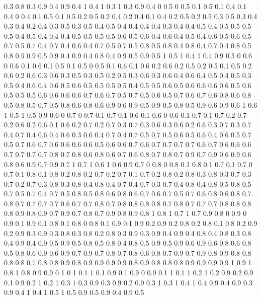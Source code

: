 0.3 0.8
0.3 0.9
0.4 0.9
0.4 1
0.4 1
0.3 1
0.3 0.9
0.4 0
0.5 0
0.5 0.1
0.5 0.1
0.4 0.1
0.4 0
0.4 0.1
0.5 0.1
0.5 0.2
0.5 0.2
0.4 0.2
0.4 0.1
0.4 0.2
0.5 0.2
0.5 0.3
0.5 0.3
0.4 0.3
0.4 0.2
0.4 0.3
0.5 0.3
0.5 0.4
0.5 0.4
0.4 0.4
0.4 0.3
0.4 0.4
0.5 0.4
0.5 0.5
0.5 0.5
0.4 0.5
0.4 0.4
0.4 0.5
0.5 0.5
0.5 0.6
0.5 0.6
0.4 0.6
0.4 0.5
0.4 0.6
0.5 0.6
0.5 0.7
0.5 0.7
0.4 0.7
0.4 0.6
0.4 0.7
0.5 0.7
0.5 0.8
0.5 0.8
0.4 0.8
0.4 0.7
0.4 0.8
0.5 0.8
0.5 0.9
0.5 0.9
0.4 0.9
0.4 0.8
0.4 0.9
0.5 0.9
0.5 1
0.5 1
0.4 1
0.4 0.9
0.5 0
0.6 0
0.6 0.1
0.6 0.1
0.5 0.1
0.5 0
0.5 0.1
0.6 0.1
0.6 0.2
0.6 0.2
0.5 0.2
0.5 0.1
0.5 0.2
0.6 0.2
0.6 0.3
0.6 0.3
0.5 0.3
0.5 0.2
0.5 0.3
0.6 0.3
0.6 0.4
0.6 0.4
0.5 0.4
0.5 0.3
0.5 0.4
0.6 0.4
0.6 0.5
0.6 0.5
0.5 0.5
0.5 0.4
0.5 0.5
0.6 0.5
0.6 0.6
0.6 0.6
0.5 0.6
0.5 0.5
0.5 0.6
0.6 0.6
0.6 0.7
0.6 0.7
0.5 0.7
0.5 0.6
0.5 0.7
0.6 0.7
0.6 0.8
0.6 0.8
0.5 0.8
0.5 0.7
0.5 0.8
0.6 0.8
0.6 0.9
0.6 0.9
0.5 0.9
0.5 0.8
0.5 0.9
0.6 0.9
0.6 1
0.6 1
0.5 1
0.5 0.9
0.6 0
0.7 0
0.7 0.1
0.7 0.1
0.6 0.1
0.6 0
0.6 0.1
0.7 0.1
0.7 0.2
0.7 0.2
0.6 0.2
0.6 0.1
0.6 0.2
0.7 0.2
0.7 0.3
0.7 0.3
0.6 0.3
0.6 0.2
0.6 0.3
0.7 0.3
0.7 0.4
0.7 0.4
0.6 0.4
0.6 0.3
0.6 0.4
0.7 0.4
0.7 0.5
0.7 0.5
0.6 0.5
0.6 0.4
0.6 0.5
0.7 0.5
0.7 0.6
0.7 0.6
0.6 0.6
0.6 0.5
0.6 0.6
0.7 0.6
0.7 0.7
0.7 0.7
0.6 0.7
0.6 0.6
0.6 0.7
0.7 0.7
0.7 0.8
0.7 0.8
0.6 0.8
0.6 0.7
0.6 0.8
0.7 0.8
0.7 0.9
0.7 0.9
0.6 0.9
0.6 0.8
0.6 0.9
0.7 0.9
0.7 1
0.7 1
0.6 1
0.6 0.9
0.7 0
0.8 0
0.8 0.1
0.8 0.1
0.7 0.1
0.7 0
0.7 0.1
0.8 0.1
0.8 0.2
0.8 0.2
0.7 0.2
0.7 0.1
0.7 0.2
0.8 0.2
0.8 0.3
0.8 0.3
0.7 0.3
0.7 0.2
0.7 0.3
0.8 0.3
0.8 0.4
0.8 0.4
0.7 0.4
0.7 0.3
0.7 0.4
0.8 0.4
0.8 0.5
0.8 0.5
0.7 0.5
0.7 0.4
0.7 0.5
0.8 0.5
0.8 0.6
0.8 0.6
0.7 0.6
0.7 0.5
0.7 0.6
0.8 0.6
0.8 0.7
0.8 0.7
0.7 0.7
0.7 0.6
0.7 0.7
0.8 0.7
0.8 0.8
0.8 0.8
0.7 0.8
0.7 0.7
0.7 0.8
0.8 0.8
0.8 0.9
0.8 0.9
0.7 0.9
0.7 0.8
0.7 0.9
0.8 0.9
0.8 1
0.8 1
0.7 1
0.7 0.9
0.8 0
0.9 0
0.9 0.1
0.9 0.1
0.8 0.1
0.8 0
0.8 0.1
0.9 0.1
0.9 0.2
0.9 0.2
0.8 0.2
0.8 0.1
0.8 0.2
0.9 0.2
0.9 0.3
0.9 0.3
0.8 0.3
0.8 0.2
0.8 0.3
0.9 0.3
0.9 0.4
0.9 0.4
0.8 0.4
0.8 0.3
0.8 0.4
0.9 0.4
0.9 0.5
0.9 0.5
0.8 0.5
0.8 0.4
0.8 0.5
0.9 0.5
0.9 0.6
0.9 0.6
0.8 0.6
0.8 0.5
0.8 0.6
0.9 0.6
0.9 0.7
0.9 0.7
0.8 0.7
0.8 0.6
0.8 0.7
0.9 0.7
0.9 0.8
0.9 0.8
0.8 0.8
0.8 0.7
0.8 0.8
0.9 0.8
0.9 0.9
0.9 0.9
0.8 0.9
0.8 0.8
0.8 0.9
0.9 0.9
0.9 1
0.9 1
0.8 1
0.8 0.9
0.9 0
1 0
1 0.1
1 0.1
0.9 0.1
0.9 0
0.9 0.1
1 0.1
1 0.2
1 0.2
0.9 0.2
0.9 0.1
0.9 0.2
1 0.2
1 0.3
1 0.3
0.9 0.3
0.9 0.2
0.9 0.3
1 0.3
1 0.4
1 0.4
0.9 0.4
0.9 0.3
0.9 0.4
1 0.4
1 0.5
1 0.5
0.9 0.5
0.9 0.4
0.9 0.5

